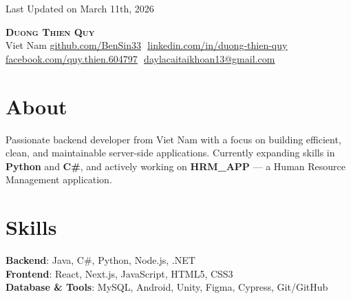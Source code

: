 \documentclass[letterpaper,11pt]{article}
\begin{document}
\begin{flushright}
  \color{gray}
  \item
  Last Updated on March 11th, 2026
\end{flushright}

\vspace{-5pt}

\begin{center}
    \textbf{\Huge \scshape Duong Thien Quy} \\ \vspace{8pt}
    \small
     Viet Nam \quad
    \href{https://github.com/BenSin33}{\underline{github.com/BenSin33}} $  $
    \href{https://www.linkedin.com/in/duong-thien-quy-8809a33a5/}{\underline{linkedin.com/in/duong-thien-quy}} $  $
    \href{https://www.facebook.com/quy.thien.604797}{\underline{facebook.com/quy.thien.604797}} $  $
    \href{mailto:daylacaitaikhoan13@gmail.com}{\underline{daylacaitaikhoan13@gmail.com}}
\end{center}

\section{About}
 \begin{itemize}[leftmargin=0.15in, label={}]
    \small{\item{
      Passionate backend developer from Viet Nam with a focus on building efficient, clean, and maintainable server-side applications. Currently expanding skills in \textbf{Python} and \textbf{C\#}, and actively working on \textbf{HRM\_APP} — a Human Resource Management application.
    }}
 \end{itemize}

\section{Skills}
 \begin{itemize}[leftmargin=0.15in, label={}]
    \small{\item{

     \textbf{Backend}{: Java, C\#, Python, Node.js, .NET} \\

     \textbf{Frontend}{: React, Next.js, JavaScript, HTML5, CSS3} \\

     \textbf{Database \& Tools}{: MySQL, Android, Unity, Figma, Cypress, Git/GitHub}

    }}
 \end{itemize}
\end{document}
